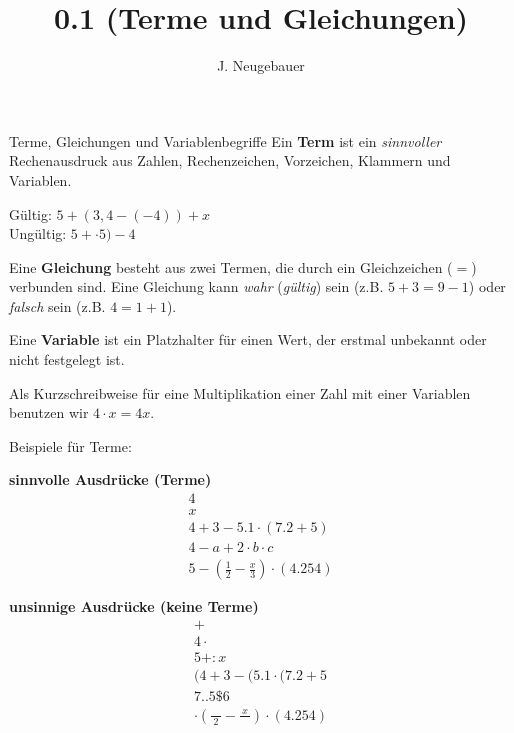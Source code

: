 \documentclass[12pt,a5paper,landscape]{scrartcl}
\author{J. Neugebauer}
\title{0.1 (Terme und Gleichungen)}
\date{\Heute}
\begin{document}
\begin{hilfekarte}{Terme, Gleichungen und Variablen}{begriffe}
	Ein \textbf{Term} ist ein \emph{sinnvoller} Rechenausdruck aus Zahlen, Rechenzeichen, Vorzeichen, Klammern und Variablen.
	
	Gültig: $5+(3,4 - (-4)) + x$\\
	Ungültig: $5+\cdot5)-4$
	
	\vspace{1cm}
	Eine \textbf{Gleichung} besteht aus zwei Termen, die durch ein Gleichzeichen ($=$) verbunden sind. Eine Gleichung kann \emph{wahr} (\emph{gültig}) sein (z.B. $5+3 = 9-1$) oder \emph{falsch} sein (z.B. $4 = 1+1$).
	
	\vspace{1cm}
	Eine \textbf{Variable} ist ein Platzhalter für einen Wert, der erstmal unbekannt oder nicht festgelegt ist.
	
	\vspace{2cm} \small
	Als Kurzschreibweise für eine Multiplikation einer Zahl mit einer Variablen benutzen wir $4\cdot x = 4x$.
\end{hilfekarte}

\begin{loesungskarte}
	Beispiele für Terme:
	\begin{multicols}{2}
		\textbf{sinnvolle Ausdrücke (Terme)}
		\begin{gather*}
		4 \\
		x \\
		4+3-5.1\cdot (7.2+5) \\
		4-a+2\cdot b \cdot c \\
		5 - \left( \frac{1}{2} - \frac{x}{3} \right)  \cdot ( 4.254 )
		\end{gather*}
		
		\textbf{unsinnige Ausdrücke (keine Terme)}
		\begin{gather*}
		+ \\
		4\cdot \\
		5+:x \\
		(4+3-(5.1\cdot (7.2+5 \\
		7..5 \$ 6 \\
		\cdot \left( \frac{\quad}{2} - \frac{x}{\quad} \right)  \cdot ( 4.254 )
		\end{gather*}
	\end{multicols}
\end{loesungskarte}
\end{document}
